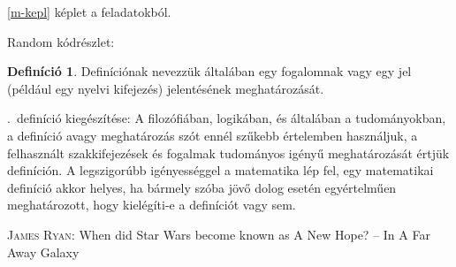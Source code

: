 \documentclass[]{thesis-ekf}
\theoremstyle{definition}
\newtheorem{definicio}[tetel]{Definíció}
\theoremstyle{remark}
\begin{document}
	\eqref{m-kepl} képlet a feladatokból.
	
	Random kódrészlet: 
	
	\begin{definicio}\label{def-definition}
		Definíciónak nevezzük általában egy fogalomnak vagy egy jel (például egy nyelvi kifejezés) jelentésének meghatározását.
	\end{definicio}
	\Az{\ref{def-definition}}.~definíció kiegészítése: A filozófiában, logikában, és általában a tudományokban, a definíció avagy meghatározás szót ennél szűkebb értelemben használjuk, a felhasznált szakkifejezések és fogalmak tudományos igényű meghatározását értjük definíción. A legszigorúbb igényességgel a matematika lép fel, egy matematikai definíció akkor helyes, ha bármely szóba jövő dolog esetén egyértelműen meghatározott, hogy kielégíti-e a definíciót vagy sem. 
	
	\begin{thebibliography}{1}
		 \textsc{James Ryan}: When did Star Wars become known as A New Hope? -- In A Far Away Galaxy
	\end{thebibliography}
\end{document}
